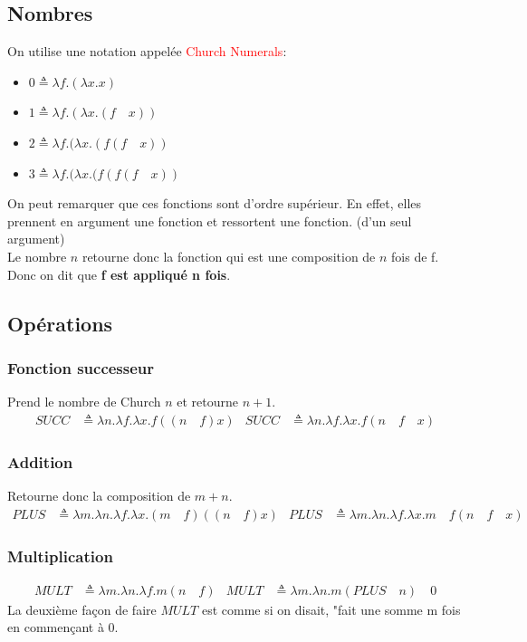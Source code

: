 \documentclass{report}
\begin{document}
\subsection{Nombres}
On utilise une notation appelée \textcolor{red}{Church Numerals}:
\begin{itemize}
\item $0 \triangleq \lambda f.(\lambda x.x)$
\item $1 \triangleq \lambda f.(\lambda x.(f \quad x))$
\item $2 \triangleq \lambda f.(\lambda x.(f (f \quad x))$
\item $3 \triangleq \lambda f.(\lambda x.(f (f (f \quad x))$
\end{itemize}
On peut remarquer que ces fonctions sont d'ordre supérieur. En effet, elles prennent en argument une fonction et ressortent une fonction. (d'un seul argument)\\
Le nombre $n$ retourne donc la fonction qui est une composition de $n$ fois de f. Donc on dit que \textbf{f est appliqué n fois}.

\subsection{Opérations}
\subsubsection{Fonction successeur}
Prend le nombre de Church $n$ et retourne $n+1$.
\begin{align*}
SUCC &\triangleq \lambda n.\lambda f.\lambda x.f((n \quad f)x) & SUCC &\triangleq \lambda n.\lambda f.\lambda x.f(n \quad f \quad x)
\end{align*}

\subsubsection{Addition}
Retourne donc la composition de $m+n$.
\begin{align*}
PLUS &\triangleq \lambda m.\lambda n.\lambda f	. \lambda x.(m \quad f)((n \quad f)x) & PLUS &\triangleq \lambda m.\lambda n.\lambda f	. \lambda x.m \quad f(n \quad f \quad x)
\end{align*}

\subsubsection{Multiplication}
\begin{align*}
MULT &\triangleq \lambda m.\lambda n.\lambda f.m (n \quad f) & MULT &\triangleq \lambda m.\lambda n.m (PLUS \quad n)\quad 0
\end{align*}
La deuxième façon de faire $MULT$ est comme si on disait, "fait une somme m fois en commençant à 0.
\end{document}
